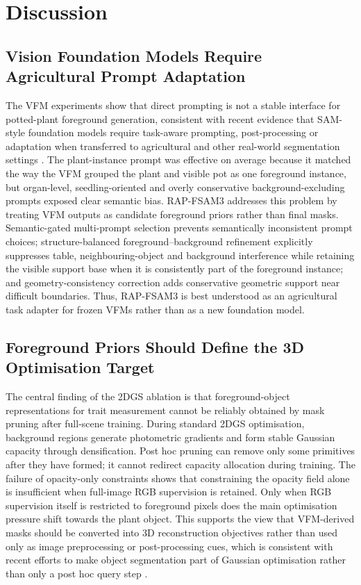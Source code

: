 \documentclass[a4paper]{cas-sc}
\begin{document}
\FloatBarrier

\section{Discussion}\label{sec:discussion}

\subsection{Vision Foundation Models Require Agricultural Prompt Adaptation}\label{sec:vfm-prompt-adaptation}

The VFM experiments show that direct prompting is not a stable interface for potted-plant foreground generation, consistent with recent evidence that SAM-style foundation models require task-aware prompting, post-processing or adaptation when transferred to agricultural and other real-world segmentation settings \cite{ref65,ref66,ref67}. The plant-instance prompt was effective on average because it matched the way the VFM grouped the plant and visible pot as one foreground instance, but organ-level, seedling-oriented and overly conservative background-excluding prompts exposed clear semantic bias. RAP-FSAM3 addresses this problem by treating VFM outputs as candidate foreground priors rather than final masks. Semantic-gated multi-prompt selection prevents semantically inconsistent prompt choices; structure-balanced foreground--background refinement explicitly suppresses table, neighbouring-object and background interference while retaining the visible support base when it is consistently part of the foreground instance; and geometry-consistency correction adds conservative geometric support near difficult boundaries. Thus, RAP-FSAM3 is best understood as an agricultural task adapter for frozen VFMs rather than as a new foundation model.

\subsection{Foreground Priors Should Define the 3D Optimisation Target}\label{sec:vfm-priors-to-3d-objective}

The central finding of the 2DGS ablation is that foreground-object representations for trait measurement cannot be reliably obtained by mask pruning after full-scene training. During standard 2DGS optimisation, background regions generate photometric gradients and form stable Gaussian capacity through densification. Post hoc pruning can remove only some primitives after they have formed; it cannot redirect capacity allocation during training. The failure of opacity-only constraints shows that constraining the opacity field alone is insufficient when full-image RGB supervision is retained. Only when RGB supervision itself is restricted to foreground pixels does the main optimisation pressure shift towards the plant object. This supports the view that VFM-derived masks should be converted into 3D reconstruction objectives rather than used only as image preprocessing or post-processing cues, which is consistent with recent efforts to make object segmentation part of Gaussian optimisation rather than only a post hoc query step \cite{ref70}.
\end{document}
